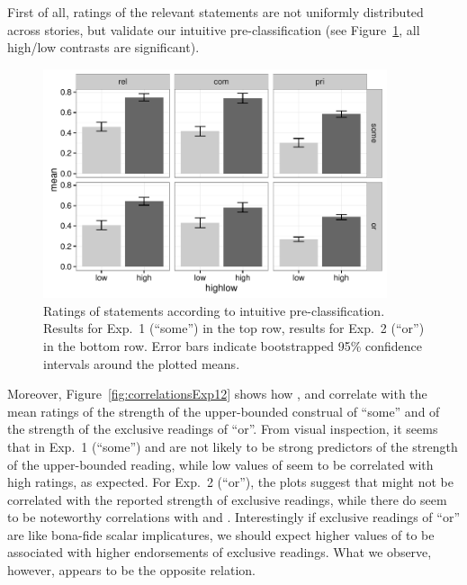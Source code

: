 \documentclass[12pt]{article}
\begin{document}
First of all, ratings of the relevant statements are not uniformly
distributed across stories, but validate our intuitive pre-classification (see
Figure~\ref{fig:EFbars12}, all high/low contrasts are significant).
%
\begin{figure}
  \centering

  \includegraphics[width = 0.9\textwidth]{pics_02/EFbarsExp12.pdf}
  
  \caption{Ratings of statements according to intuitive pre-classification. Results for
    Exp.~1 (``some'') in the top row, results for Exp.~2 (``or'') in the bottom
    row. Error bars indicate bootstrapped 95\% confidence intervals around the plotted means.}
  \label{fig:EFbars12}
\end{figure}
%
Moreover, Figure~\ref{fig:correlationsExp12} shows how \rel, \com and \pri correlate with the
mean ratings of the strength of the upper-bounded construal of ``some'' and of the strength of the exclusive readings of
``or''. From visual inspection, it seems that in Exp.~1 (``some'') \rel and \com are not
likely to be strong predictors of the strength of the upper-bounded reading, while low values of \pri seem to be
correlated with high ratings, as expected. For Exp.~2 (``or''), the plots suggest
that \rel might not be correlated with the reported strength of exclusive readings, while there
do seem to be noteworthy correlations with \com and \pri. Interestingly if
exclusive readings of ``or'' are like bona-fide scalar implicatures, we should expect
higher values of \com to be associated with higher endorsements of exclusive
readings. What we observe, however, appears to be the opposite relation.
\end{document}
